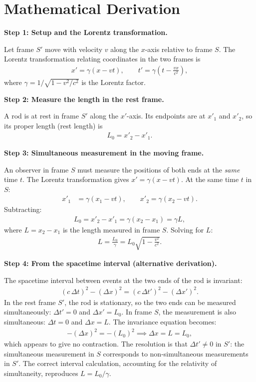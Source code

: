 \section*{Mathematical Derivation}

\textbf{Step 1: Setup and the Lorentz transformation.}

Let frame $S'$ move with velocity $v$ along the $x$-axis relative to frame $S$. The Lorentz transformation relating coordinates in the two frames is
\begin{align}
x' = \gamma(x - vt), \qquad t' = \gamma\!\left(t - \frac{vx}{c^2}\right),
\end{align}
where $\gamma = 1/\sqrt{1 - v^2/c^2}$ is the Lorentz factor.

\textbf{Step 2: Measure the length in the rest frame.}

A rod is at rest in frame $S'$ along the $x'$-axis. Its endpoints are at $x'_1$ and $x'_2$, so its proper length (rest length) is
\begin{align}
L_0 = x'_2 - x'_1.
\end{align}

\textbf{Step 3: Simultaneous measurement in the moving frame.}

An observer in frame $S$ must measure the positions of both ends at the \emph{same} time $t$. The Lorentz transformation gives $x' = \gamma(x - vt)$. At the same time $t$ in $S$:
\begin{align}
x'_1 &= \gamma(x_1 - vt), \qquad x'_2 = \gamma(x_2 - vt).
\end{align}
Subtracting:
\begin{align}
L_0 = x'_2 - x'_1 = \gamma(x_2 - x_1) = \gamma L,
\end{align}
where $L = x_2 - x_1$ is the length measured in frame $S$. Solving for $L$:
\begin{align}
\boxed{L = \frac{L_0}{\gamma} = L_0\sqrt{1 - \frac{v^2}{c^2}}.}
\end{align}

\textbf{Step 4: From the spacetime interval (alternative derivation).}

The spacetime interval between events at the two ends of the rod is invariant:
\begin{align}
(c\,\Delta t)^2 - (\Delta x)^2 = (c\,\Delta t')^2 - (\Delta x')^2.
\end{align}
In the rest frame $S'$, the rod is stationary, so the two ends can be measured simultaneously: $\Delta t' = 0$ and $\Delta x' = L_0$. In frame $S$, the measurement is also simultaneous: $\Delta t = 0$ and $\Delta x = L$. The invariance equation becomes:
\begin{align}
-(\Delta x)^2 = -(L_0)^2 \implies \Delta x = L = L_0,
\end{align}
which appears to give no contraction. The resolution is that $\Delta t' \neq 0$ in $S'$: the simultaneous measurement in $S$ corresponds to non-simultaneous measurements in $S'$. The correct interval calculation, accounting for the relativity of simultaneity, reproduces $L = L_0/\gamma$.

